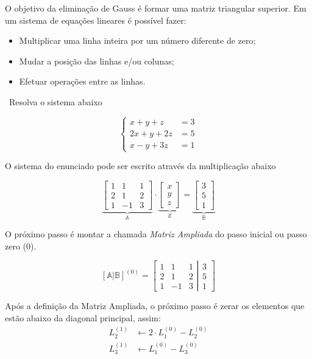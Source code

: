 O objetivo da eliminação de Gauss é formar uma matriz triangular superior. 
Em um sistema de equações lineares é possível fazer:
\begin{itemize}
	\item Multiplicar uma linha inteira por um número diferente de zero;
	\item Mudar a posição das linhas e/ou colunas;
	\item Efetuar operações entre as linhas.
\end{itemize}
\begin{example}
	\video \, Resolva o sistema abaixo
	
	$$
	\begin{cases}
	x+y+z & =3\\
	2x+y+2z & =5\\
	x-y+3z & =1
	\end{cases}
	$$


\solucao

	O sistema do enunciado pode ser escrito através da multiplicação abaixo
	
	$$
	\underbrace{\begin{bmatrix}1 & 1 & 1\\
		2 & 1 & 2\\
		1 & -1 & 3
		\end{bmatrix}}_{\mathbb{A}}\cdot\underbrace{\begin{bmatrix}x\\
		y\\
		z
		\end{bmatrix}}_{\mathbb{X}}=\underbrace{\begin{bmatrix}3\\
		5\\
		1
		\end{bmatrix}}_{\mathbb{B}}
	$$
	
	O próximo passo é montar a chamada \textit{Matriz Ampliada} do passo inicial ou passo zero (0).
	
	$$
		\left[ \mathbb{A}|\mathbb{B}\right ]^{(0)}=\left[ \begin{matrix}1&1&1\\2&1&2\\1&-1&3 \end{matrix} \left| \begin{matrix} 3\\5\\1\end{matrix}\right. \right ]
	$$
	
	Após a definição da Matriz Ampliada, o próximo passo é zerar os elementos que estão abaixo da diagonal principal, assim:
	\[
	\begin{aligned}
	L_2^{(1)} &\leftarrow 2\cdot L_1^{(0)}-L_2^{(0)} \\
	L_3^{(1)} &\leftarrow L_1^{(0)}-L_3^{(0)}
	\end{aligned}
	\]
	

\end{example}
